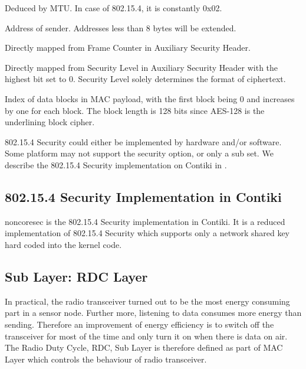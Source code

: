 \begin{description}[style=nextline]
	\item[\textbf{Flag}]
	 Deduced by MTU. In case of 802.15.4, it is constantly 0x02.
	\item[\textbf{Source Address}]
	Address of sender. Addresses less than 8 bytes will be extended.
	\item[\textbf{Frame Counter}]
	Directly mapped from Frame Counter in Auxiliary Security Header.
	\item[\textbf{Security Level}]
	Directly mapped from Security Level in Auxiliary Security Header with the highest bit set to $0$. Security Level solely determines the format of ciphertext.
	\item[\textbf{Block Counter}]
	Index of data blocks in MAC payload, with the first block being 0 and increases by one for each block. The block length is 128 bits since AES-128 is the underlining block cipher.
\end{description}

802.15.4 Security could either be implemented by hardware and/or software. Some platform may not support the security option, or only a sub set. We describe the 802.15.4 Security implementation on Contiki in .

\subsection{802.15.4 Security Implementation in Contiki} \label{Subsec: 802.15.4 Security Implementation in Contiki}
noncoresec\cite{noncoresec} is the 802.15.4 Security implementation in Contiki. It is a reduced implementation of 802.15.4 Security which supports only a network shared key hard coded into the kernel code.

\subsection{Sub Layer: RDC Layer}

In practical, the radio transceiver turned out to be the most energy consuming part in a sensor node. Further more, listening to data consumes more energy than sending. Therefore an improvement of energy efficiency is to switch off the transceiver for most of the time and only turn it on when there is data on air. The Radio Duty Cycle, RDC, Sub Layer is therefore defined as part of MAC Layer which controls the behaviour of radio transceiver.

